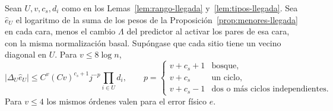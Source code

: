 \begin{proposicion}\label{prop:soportes-llegada}
Sean \(U,v,c_s,d_i\) como en los Lemas~\ref{lem:rango-llegada} y~\ref{lem:tipos-llegada}.
Sea \(\widehat e_U\) el logaritmo de la suma de los pesos de la
Proposición~\ref{prop:menores-llegada} en cada cara, menos el cambio \(\Lambda\)
del predictor al activar los pares de esa cara, con la misma normalización basal.
Supóngase que cada sitio tiene un vecino diagonal en \(U\). Para \(v\le8\log n\),
\[
 |\Delta_U\widehat e_U|\le C^v(Cv)^{c_s+1}j^{-p}\prod_{i\in U}d_i,\qquad
 p=\begin{cases}v+c_s+1&\text{bosque},\\v+c_s&\text{un ciclo},\\
 v+c_s-1&\text{dos o más ciclos independientes}.\end{cases}
\]
Para \(v\le4\) los mismos órdenes valen para el error físico \(e\).
\end{proposicion}

